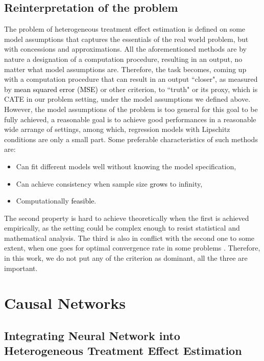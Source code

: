 \documentclass[11pt,paper=letter]{scrartcl}
\newcommand\hz[1]{\textcolor{black}{#1}}
\begin{document}
\subsection{Reinterpretation of the problem}

The problem of heterogeneous treatment effect estimation is defined on some model assumptions that captures the essentials of the real world problem, but with concessions and approximations. All the aforementioned methods are by nature a designation of a computation procedure, resulting in an output, no matter what model assumptions are. Therefore, the task becomes, coming up with a computation procedure that can result in an output ``closer", as measured by \hz{mean squared error (MSE)} or other criterion, to ``truth" or its proxy, which is CATE in our problem setting, under the model assumptions we defined above. However, the model assumptions of the problem is too general for this goal to be fully achieved, a reasonable goal is to achieve good performances in a reasonable wide arrange of settings, among which, regression models with Lipschitz conditions are only a small part. Some preferable characteristics of such methods are:
\begin{itemize}
\item Can fit different models well without knowing the model specification,
\item Can achieve consistency when sample size \hz{grows} to infinity,
\item Computationally \hz{feasible}.
\end{itemize}

The second property is hard to achieve theoretically when the first is achieved empirically, as the setting could be complex enough to resist statistical and mathematical analysis. The third is also in conflict with the second one to some extent, when one goes for optimal convergence rate in some problems \cite{cai2017}. Therefore, in this work, we do not put any of the criterion as dominant, all the three are important.



\section{Causal Networks}


\subsection{Integrating Neural Network into Heterogeneous Treatment Effect Estimation}
\end{document}
